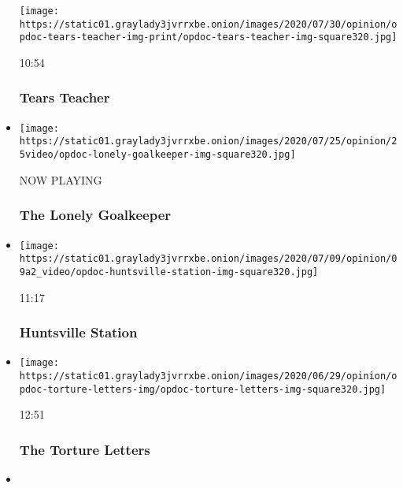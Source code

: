 \begin{itemize}
  \texttt{[image: https://static01.graylady3jvrrxbe.onion/images/2020/07/30/opinion/opdoc-tears-teacher-img-print/opdoc-tears-teacher-img-square320.jpg]}

  10:54

  \hypertarget{tears-teacher}{%
  \subsubsection{Tears Teacher}\label{tears-teacher}}
\item
  \texttt{[image: https://static01.graylady3jvrrxbe.onion/images/2020/07/25/opinion/25video/opdoc-lonely-goalkeeper-img-square320.jpg]}

  NOW PLAYING

  \hypertarget{the-lonely-goalkeeper-2}{%
  \subsubsection{The Lonely Goalkeeper}\label{the-lonely-goalkeeper-2}}
\item
  \href{https://www.nytimes3xbfgragh.onion/video/opinion/100000007080462/huntsville-station.html?action=click\&module=video-series-bar\&region=header\&pgtype=Article\&playlistId=video/op-docs}{}

  \texttt{[image: https://static01.graylady3jvrrxbe.onion/images/2020/07/09/opinion/09a2\_video/opdoc-huntsville-station-img-square320.jpg]}

  11:17

  \hypertarget{huntsville-station}{%
  \subsubsection{Huntsville Station}\label{huntsville-station}}
\item
  \href{https://www.nytimes3xbfgragh.onion/video/opinion/100000007205588/the-torture-letters.html?action=click\&module=video-series-bar\&region=header\&pgtype=Article\&playlistId=video/op-docs}{}

  \texttt{[image: https://static01.graylady3jvrrxbe.onion/images/2020/06/29/opinion/opdoc-torture-letters-img/opdoc-torture-letters-img-square320.jpg]}

  12:51

  \hypertarget{the-torture-letters}{%
  \subsubsection{The Torture Letters}\label{the-torture-letters}}
\item
  \href{https://www.nytimes3xbfgragh.onion/video/opinion/100000007172575/forgiveness-day.html?action=click\&module=video-series-bar\&region=header\&pgtype=Article\&playlistId=video/op-docs}{}


\end{itemize}

